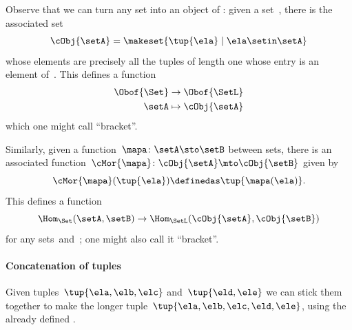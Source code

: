 {Observe that we can turn any set into an object of \SetL: given a set~\setA, there is the associated set
\begin{equation}
    \label{eq:setintosetl}
    \cObj{\setA} = \makeset{ \tup{\ela} \mid \ela \setin \setA }
\end{equation}
whose elements are precisely all the tuples of length one whose entry is an element of~\setA.
This defines a function
\begin{equation}
    \label{eq:setintosetlfunction}
    \begin{aligned}
        \Obof{\Set} & \to \Obof{\SetL} \\
        \setA       & \mapsto \cObj{\setA}
    \end{aligned}
\end{equation}
which one might call ``bracket''.

Similarly, given a function~$\mapa \colon \setA \sto \setB$ between sets, there is an associated function~$\cMor{ \mapa }\colon \cObj{\setA} \mto \cObj{\setB}$ given by
\begin{equation}
    \label{eq:functionintosetlmor}
    \cMor{ \mapa } ( \tup{\ela }) \definedas \tup{\mapa(\ela)}.
\end{equation}
This defines a function
\begin{equation}
    \label{eq:functionintosetlmorfun}
    \Hom_{\Set}(\setA,\setB) \to \Hom_{\SetL}(\cObj{\setA},\cObj{\setB})
\end{equation}
for any sets~\setA and~\setB; one might also call it ``bracket''.

\paragraph{Concatenation of tuples}

Given tuples~$\tup{\ela, \elb, \elc}$ and~$\tup{\eld, \ele}$ we can stick them together to make the longer tuple~$\tup{\ela, \elb, \elc, \eld, \ele}$, using the already defined .


}
